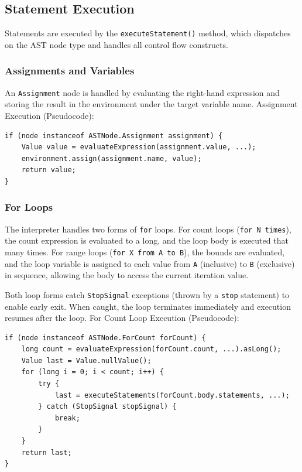 \subsection{Statement Execution}

Statements are executed by the \texttt{executeStatement()} method, which dispatches on the AST node type and handles all control flow constructs.

\subsubsection{Assignments and Variables}

An \texttt{Assignment} node is handled by evaluating the right-hand expression and storing the result in the environment under the target variable name.
Assignment Execution (Pseudocode):

\begin{lstlisting}
if (node instanceof ASTNode.Assignment assignment) {
    Value value = evaluateExpression(assignment.value, ...);
    environment.assign(assignment.name, value);
    return value;
}
\end{lstlisting}

\subsubsection{For Loops}

The interpreter handles two forms of \texttt{for} loops.
For count loops (\texttt{for N times}), the count expression is evaluated to a long, and the loop body is executed that many times.
For range loops (\texttt{for X from A to B}), the bounds are evaluated, and the loop variable is assigned to each value from \texttt{A} (inclusive) to \texttt{B} (exclusive) in sequence, allowing the body to access the current iteration value.

Both loop forms catch \texttt{StopSignal} exceptions (thrown by a \texttt{stop} statement) to enable early exit.
When caught, the loop terminates immediately and execution resumes after the loop.
For Count Loop Execution (Pseudocode):

\begin{lstlisting}
if (node instanceof ASTNode.ForCount forCount) {
    long count = evaluateExpression(forCount.count, ...).asLong();
    Value last = Value.nullValue();
    for (long i = 0; i < count; i++) {
        try {
            last = executeStatements(forCount.body.statements, ...);
        } catch (StopSignal stopSignal) {
            break;
        }
    }
    return last;
}
\end{lstlisting}

